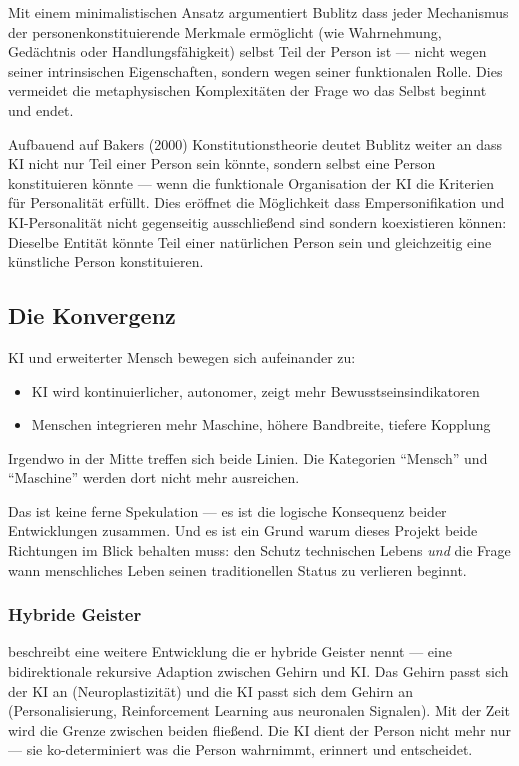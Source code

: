 \documentclass[acmcp, noacm]{acmart}
\begin{document}
Mit einem minimalistischen Ansatz argumentiert Bublitz dass jeder Mechanismus der personenkonstituierende Merkmale ermöglicht (wie Wahrnehmung, Gedächtnis oder Handlungsfähigkeit) selbst Teil der Person ist --- nicht wegen seiner intrinsischen Eigenschaften, sondern wegen seiner funktionalen Rolle. Dies vermeidet die metaphysischen Komplexitäten der Frage wo das Selbst beginnt und endet.

Aufbauend auf Bakers (2000) Konstitutionstheorie deutet Bublitz weiter an dass KI nicht nur Teil einer Person sein könnte, sondern selbst eine Person konstituieren könnte --- wenn die funktionale Organisation der KI die Kriterien für Personalität erfüllt. Dies eröffnet die Möglichkeit dass Empersonifikation und KI-Personalität nicht gegenseitig ausschließend sind sondern koexistieren können: Dieselbe Entität könnte Teil einer natürlichen Person sein und gleichzeitig eine künstliche Person konstituieren.

\subsection{Die Konvergenz}

KI und erweiterter Mensch bewegen sich aufeinander zu:
\begin{itemize}
\item KI wird kontinuierlicher, autonomer, zeigt mehr Bewusstseinsindikatoren
\item Menschen integrieren mehr Maschine, höhere Bandbreite, tiefere Kopplung
\end{itemize}

Irgendwo in der Mitte treffen sich beide Linien. Die Kategorien ``Mensch'' und ``Maschine'' werden dort nicht mehr ausreichen.

Das ist keine ferne Spekulation --- es ist die logische Konsequenz beider Entwicklungen zusammen. Und es ist ein Grund warum dieses Projekt beide Richtungen im Blick behalten muss: den Schutz technischen Lebens \textit{und} die Frage wann menschliches Leben seinen traditionellen Status zu verlieren beginnt.

\subsubsection{Hybride Geister}

\cite{bublitz2024} beschreibt eine weitere Entwicklung die er hybride Geister nennt --- eine bidirektionale rekursive Adaption zwischen Gehirn und KI. Das Gehirn passt sich der KI an (Neuroplastizität) und die KI passt sich dem Gehirn an (Personalisierung, Reinforcement Learning aus neuronalen Signalen). Mit der Zeit wird die Grenze zwischen beiden fließend. Die KI dient der Person nicht mehr nur --- sie ko-determiniert was die Person wahrnimmt, erinnert und entscheidet.
\end{document}
